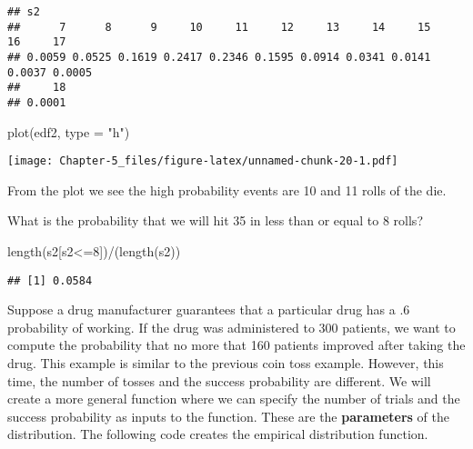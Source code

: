 \documentclass[
]{article}
\newenvironment{Shaded}{\begin{snugshade}}{\end{snugshade}}
\newcommand{\AttributeTok}[1]{\textcolor[rgb]{0.77,0.63,0.00}{#1}}
\newcommand{\DecValTok}[1]{\textcolor[rgb]{0.00,0.00,0.81}{#1}}
\newcommand{\FunctionTok}[1]{\textcolor[rgb]{0.00,0.00,0.00}{#1}}
\newcommand{\NormalTok}[1]{#1}
\newcommand{\SpecialCharTok}[1]{\textcolor[rgb]{0.00,0.00,0.00}{#1}}
\newcommand{\StringTok}[1]{\textcolor[rgb]{0.31,0.60,0.02}{#1}}
\begin{document}
\begin{verbatim}
## s2
##      7      8      9     10     11     12     13     14     15     16     17 
## 0.0059 0.0525 0.1619 0.2417 0.2346 0.1595 0.0914 0.0341 0.0141 0.0037 0.0005 
##     18 
## 0.0001
\end{verbatim}

\begin{Shaded}
\begin{Highlighting}[]
\FunctionTok{plot}\NormalTok{(edf2, }\AttributeTok{type =} \StringTok{"h"}\NormalTok{)}
\end{Highlighting}
\end{Shaded}

\texttt{[image: Chapter-5\_files/figure-latex/unnamed-chunk-20-1.pdf]}

From the plot we see the high probability events are 10 and 11 rolls of
the die.

What is the probability that we will hit 35 in less than or equal to 8
rolls?

\begin{Shaded}
\begin{Highlighting}[]
\FunctionTok{length}\NormalTok{(s2[s2}\SpecialCharTok{\textless{}=}\DecValTok{8}\NormalTok{])}\SpecialCharTok{/}\NormalTok{(}\FunctionTok{length}\NormalTok{(s2))}
\end{Highlighting}
\end{Shaded}

\begin{verbatim}
## [1] 0.0584
\end{verbatim}

Suppose a drug manufacturer guarantees that a particular drug has a .6
probability of working. If the drug was administered to 300 patients, we
want to compute the probability that no more that 160 patients improved
after taking the drug. This example is similar to the previous coin toss
example. However, this time, the number of tosses and the success
probability are different. We will create a more general function where
we can specify the number of trials and the success probability as
inputs to the function. These are the \textbf{parameters} of the
distribution. The following code creates the empirical distribution
function.
\end{document}
